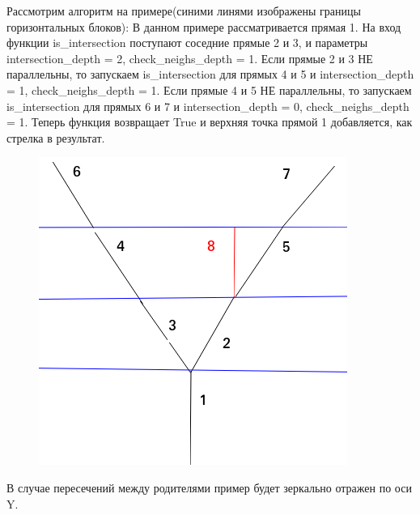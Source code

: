 \newpage
Рассмотрим алгоритм на примере(синими линями изображены границы горизонтальных блоков): 
\newline
В данном примере рассматривается прямая 1. \newline На вход функции is\_intersection поступают соседние прямые 2 и 3, и параметры intersection\_depth = 2, check\_neighs\_depth = 1.
\newline
Если прямые 2 и 3 НЕ параллельны, то запускаем is\_intersection для прямых 4 и 5 и intersection\_depth = 1, check\_neighs\_depth = 1.
\newline
Если прямые 4 и 5 НЕ параллельны, то запускаем  is\_intersection для прямых 6 и 7 и intersection\_depth = 0, check\_neighs\_depth = 1. Теперь функция возвращает True и верхняя точка прямой 1 добавляется, как стрелка в результат.
\begin{figure}[!h]
	\centering
	\includegraphics[width=0.7\linewidth]{pictures/intersection_example}
	\caption[Intersection]{}
	\label{fig:intersectionexample}
\end{figure}

В случае пересечений между родителями пример будет зеркально отражен по оси Y.

